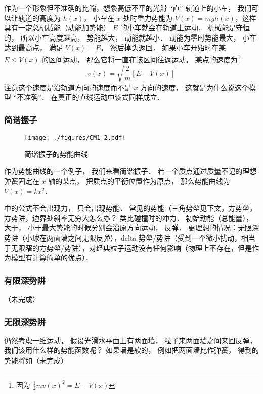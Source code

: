 作为一个形象但不准确的比喻，想象高低不平的光滑 “直” 轨道上的小车， 我们可以让轨道的高度为 $h(x)$， 小车在 $x$ 处时重力势能为 $V(x) = mgh(x)$，这样具有一定总机械能（动能加势能） $E$ 的小车就会在轨道上运动． 机械能是守恒的， 所以小车高度越高， 势能越大， 动能就越小． 动能为零时势能最大， 小车达到最高点， 满足 $V(x) = E$， 然后掉头返回． 如果小车开始时在某 $E \leq V(x)$ 的区间运动， 那么它将一直在该区间往返运动， 某点的速度为\footnote{因为 $\frac{1}{2}mv(x)^2 = E - V(x)$}
\begin{equation}
v(x) = \sqrt{\frac{2}{m}[E - V(x)]}
\end{equation}
注意这个速度是沿轨道方向的速度而不是 $x$ 方向的速度， 这就是为什么说这个模型 “不准确”． 在真正的直线运动中该式同样成立．



\subsubsection{简谐振子}

\begin{figure}[ht]
\centering
\texttt{[image: ./figures/CM1\_2.pdf]}
\caption{简谐振子的势能曲线} \label{CM1_fig2}
\end{figure}

作为势能曲线的一个例子， 我们来看简谐振子． 若一个质点通过质量不记的理想弹簧固定在 $x$ 轴的某点， 把质点的平衡位置作为原点， 那么势能曲线为 $V(x) = kx^2$．


中的公式不会出现力， 只会出现势能． 常见的势能（三角势垒见下文，方势垒，方势阱，边界处斜率无穷大怎么办？ 类比碰撞时的冲力． 初始动能（总能量）， 大于， 小于最大势能的时候分别会沿原方向运动， 反弹． 更理想的情况：无限深势阱（小球在两面墙之间无限反弹），delta 势垒/势阱（受到一个微小扰动，相当于无限窄的方势垒/势阱），对经典粒子运动没有任何影响（物理上不存在，但是作为模型有计算简单的优点）．

\subsubsection{有限深势阱}
（未完成）

\subsubsection{无限深势阱}
仍然考虑一维运动， 假设光滑水平面上有两面墙， 粒子来两面墙之间来回反弹， 我们该用什么样的势能函数呢？ 如果墙是软的， 例如把两面墙比作弹簧， 得到的势能将如（未完成）
